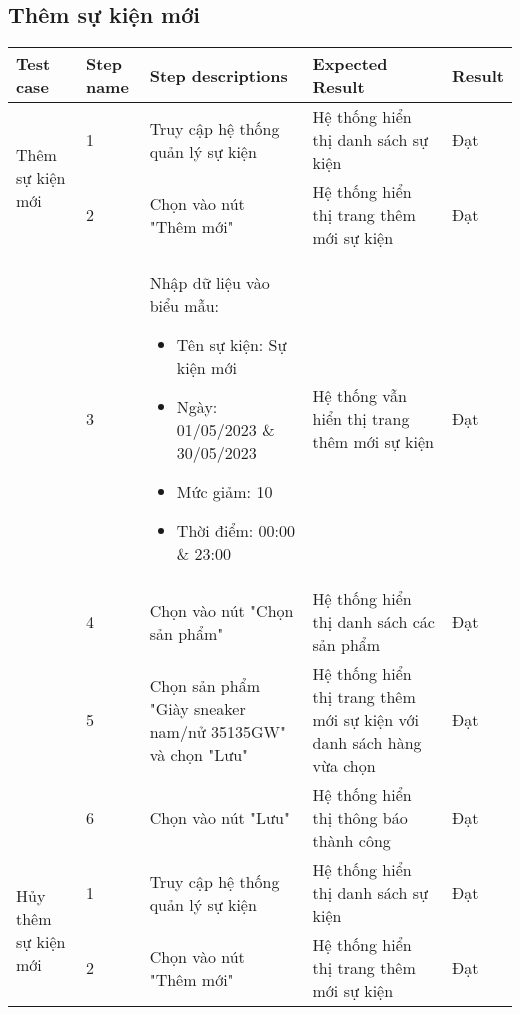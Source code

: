 \newpage

\subsection{Thêm sự kiện mới}
{
    \setlength\extrarowheight{6pt}
    \begin{longtable}{| p{2.5cm}| p{1cm}| p{5.5cm}| p{4.5cm} | p{1.5cm} |}
        \hline
        \textbf{Test case} & \textbf{Step name} & \textbf{Step descriptions} & \textbf{Expected Result} & \textbf{Result} \\
        \hline
        \multirow[t]{2}{2.5cm}{Thêm sự kiện mới} & 1 & Truy cập hệ thống quản lý sự kiện & Hệ thống hiển thị danh sách sự kiện & Đạt \\
        \cline{2-5}
         & 2 & Chọn vào nút "Thêm mới" & Hệ thống hiển thị trang thêm mới sự kiện & Đạt \\
        \cline{2-5}
        & 3 & Nhập dữ liệu vào biểu mẫu:
        \begin{itemize}
            \item Tên sự kiện: Sự kiện mới
            \item Ngày: 01/05/2023 \& 30/05/2023
            \item Mức giảm: 10
            \item Thời điểm: 00:00 \& 23:00 
        \end{itemize} & Hệ thống vẫn hiển thị trang thêm mới sự kiện & Đạt \\
        \cline{2-5}
         & 4 & Chọn vào nút "Chọn sản phẩm" & Hệ thống hiển thị danh sách các sản phẩm & Đạt \\
         \cline{2-5}
         & 5 & Chọn sản phẩm "Giày sneaker nam/nử 35135GW" và chọn "Lưu" & Hệ thống hiển thị trang thêm mới sự kiện với danh sách hàng vừa chọn & Đạt \\
         \cline{2-5}
         & 6 & Chọn vào nút "Lưu" & Hệ thống hiển thị thông báo thành công & Đạt \\
        \hline
        \multirow[t]{2}{2.5cm}{Hủy thêm sự kiện mới} & 1 & Truy cập hệ thống quản lý sự kiện & Hệ thống hiển thị danh sách sự kiện & Đạt \\
        \cline{2-5}
         & 2 & Chọn vào nút "Thêm mới" & Hệ thống hiển thị trang thêm mới sự kiện & Đạt \\

\end{longtable}}
